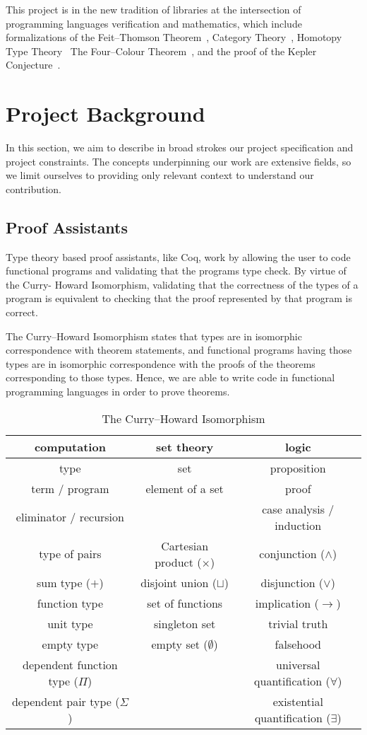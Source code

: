 \documentclass{article}
\theoremstyle{definition}
\begin{document}
This project is in the new tradition of libraries at the intersection of programming languages verification and mathematics, which include formalizations of the Feit--Thomson Theorem~\cite{Gonthier2013}, Category Theory~\cite{category-coq-experience}, Homotopy Type Theory~\cite{Bauer:2017:HLF:3018610.3018615} The Four--Colour Theorem~\cite{gonthier2005computer,gonthier2008formal}, and the proof of the Kepler Conjecture~\cite{hales2015formal}. 


\section{Project Background}
In this section, we aim to describe in broad strokes our project specification and project constraints. The concepts underpinning our work are extensive fields, so we limit ourselves to providing only relevant context to understand our contribution. 

\subsection{Proof Assistants}
Type theory based proof assistants, like Coq, work by allowing the user to code functional programs and validating that the programs type check. By virtue of the Curry- Howard Isomorphism, validating that the correctness of the types of a program is equivalent to checking that the proof represented by that program is correct. 

The Curry--Howard Isomorphism states that types are in isomorphic correspondence with theorem statements, and functional programs having those types are in isomorphic correspondence with the proofs of the theorems corresponding to those types. Hence, we are able to write code in functional programming languages in order to prove theorems.

\begin{table}[t]
\centering
\noindent
\begin{tabular}{c|c|c}
computation & set theory & logic \\ \hline
type & set & proposition \\
term / program & element of a set & proof \\
eliminator / recursion & & case analysis / induction \\
type of pairs & Cartesian product ($\times$) & conjunction ($\wedge$) \\
sum type ($+$) & disjoint union ($\sqcup$) & disjunction ($\vee$) \\
function type & set of functions & implication ($\to$) \\
unit type & singleton set & trivial truth \\
empty type & empty set ($\emptyset$) & falsehood \\
dependent function type ($\Pi$) & & universal quantification ($\forall$) \\
dependent pair type ($\Sigma$) & & existential quantification ($\exists$)
\end{tabular}
\caption{The Curry--Howard Isomorphism}
\label{tab:curry-howard}
\end{table}
\end{document}
